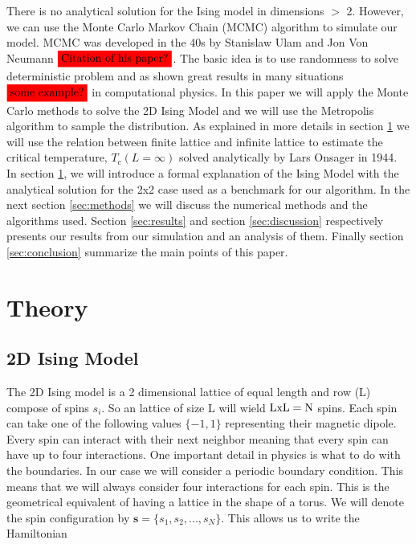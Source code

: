 \documentclass[english,notitlepage,reprint,nofootinbib]{revtex4-2}  %
\begin{document}
	There is no analytical solution for the Ising model in dimensions $>$ 2. However, we can use the Monte Carlo Markov Chain (MCMC) algorithm to simulate our model. 
	MCMC was developed in the 40s by Stanislaw Ulam and Jon Von Neumann $\colorbox{red}{Citation of his paper?}$. The basic idea is to use randomness to solve deterministic problem and as shown great 
	results in many situations $\colorbox{red}{some example?}$ in computational physics. In this
	paper we will apply the Monte Carlo methods to solve the 2D Ising Model and we will use the 
	Metropolis algorithm to sample the distribution. As explained in more details in section
	\ref{sec:theory} we will use the relation between finite lattice and infinite lattice to 
	estimate the critical temperature, $T_c(L=\infty)$ solved analytically by Lars Onsager in 1944. \\
	
	In section \ref{sec:theory}, we will introduce a formal explanation of the Ising Model 
	with the analytical solution for the 2x2 case used as a benchmark for our algorithm. In the
	next section \ref{sec:methods} we will discuss the numerical methods and the algorithms 
	used. Section \ref{sec:results} and section \ref{sec:discussion} respectively presents our
	results from our simulation and an analysis of them. Finally section \ref{sec:conclusion} summarize the main points of this paper.   

	\section{Theory}\label{sec:theory}
	\subsection{2D Ising Model} \label{subsec:Ising}
	The 2D Ising model is a 2 dimensional lattice of equal length and row (L) compose of spins
	$s_i$. So an lattice of size L will wield $\rm LxL=N$ spins. Each spin can take one of the
	following values $\{-1,	1\}$ representing their magnetic dipole. Every spin can interact 
	with their next neighbor meaning that every spin can have up to four interactions. One 
	important detail in physics is what to do with the boundaries. In our case we will consider 
	a periodic boundary condition. This means that we will always consider four interactions
	for each spin. This is the geometrical equivalent of having a lattice in the shape of a 
	torus. We will denote the spin configuration by $\textbf{s}=\{s_1, s_2, ..., s_N\}$. This allows us 
	to write the Hamiltonian 
	
\end{document}
